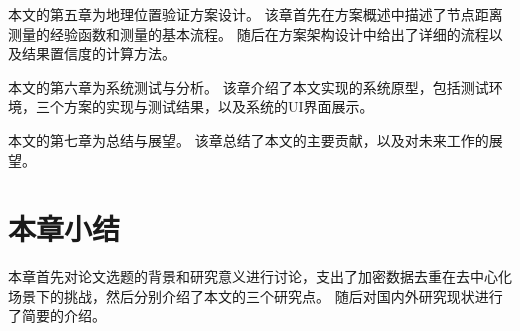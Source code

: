 本文的第五章为地理位置验证方案设计。
%
该章首先在方案概述中描述了节点距离测量的经验函数和测量的基本流程。
%
随后在方案架构设计中给出了详细的流程以及结果置信度的计算方法。



本文的第六章为系统测试与分析。
%
该章介绍了本文实现的系统原型，包括测试环境，三个方案的实现与测试结果，以及系统的UI界面展示。



本文的第七章为总结与展望。
%
该章总结了本文的主要贡献，以及对未来工作的展望。


\section{本章小结}

本章首先对论文选题的背景和研究意义进行讨论，支出了加密数据去重在去中心化场景下的挑战，然后分别介绍了本文的三个研究点。
%
随后对国内外研究现状进行了简要的介绍。

\endinput